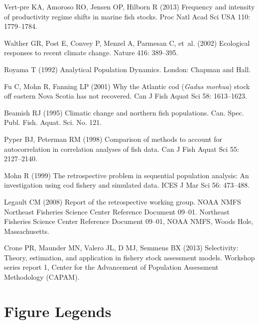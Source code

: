 \documentclass[11pt]{article}
\begin{document}
\begin{spacing}{1.2}
\begin{thebibliography}{10}
Vert-pre KA, Amoroso RO, Jensen OP, Hilborn R (2013) Frequency and intensity of
  productivity regime shifts in marine fish stocks.
\newblock Proc Natl Acad Sci USA 110: 1779--1784.

Walther GR, Post E, Convey P, Menzel A, Parmesan C, et~al. (2002) Ecological
  responses to recent climate change.
\newblock Nature 416: 389--395.

Royama T (1992) Analytical Population Dynamics.
\newblock London: Chapman and Hall.

Fu C, Mohn R, Fanning LP (2001) Why the {Atlantic cod} (\textit{Gadus morhua})
  stock off eastern {Nova Scotia} has not recovered.
\newblock Can J Fish Aquat Sci 58: 1613--1623.

Beamish RJ (1995) Climatic change and northern fish populations.
\newblock Can. Spec. Publ. Fish. Aquat. Sci. No. 121.

Pyper BJ, Peterman RM (1998) Comparison of methods to account for
  autocorrelation in correlation analyses of fish data.
\newblock Can J Fish Aquat Sci 55: 2127--2140.

Mohn R (1999) The retrospective problem in sequential population analysis: An
  investigation using cod fishery and simulated data.
\newblock ICES J Mar Sci 56: 473--488.

Legault CM (2008) Report of the retrospective working group. {NOAA NMFS
  Northeast Fisheries Science Center Reference Document} 09--01.
\newblock Northeast Fisheries Science Center Reference Document 09--01, NOAA
  NMFS, Woods Hole, Massachusetts.

Crone PR, Maunder MN, Valero JL, D MJ, Semmens BX (2013) Selectivity: Theory,
  estimation, and application in fishery stock assessment models.
\newblock Workshop series report 1, Center for the Advancement of Population
  Assessment Methodology (CAPAM).

\end{thebibliography}


\clearpage

\section*{Figure Legends}


\end{spacing}
\end{document}
